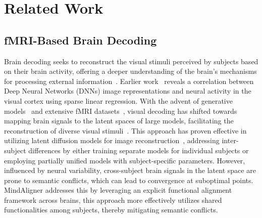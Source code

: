 \section{Related Work}
\subsection{fMRI-Based Brain Decoding}
Brain decoding seeks to reconstruct the visual stimuli perceived by subjects based on their brain activity, offering a deeper understanding of the brain's mechanisms for processing external information~\cite{Naselaris2011}.
Earlier work~\cite{Horikawa2017} reveals a correlation between Deep Neural Networks (DNNs) image representations and neural activity in the visual cortex using sparse linear regression.
With the advent of generative models~\cite{gan, diffusion} and extensive fMRI datasets~\cite{nsd}, visual decoding has shifted towards mapping brain signals to the latent spaces of large models, facilitating the reconstruction of diverse visual stimuli~\cite{gu2022decoding, ozcelik2022reconstruction, Shen2019, gao2023mind, maisurvey, gao2024fmri}.
This approach has proven effective in utilizing latent diffusion models for image reconstruction~\cite{Lin2022, Takagi2023, maiunibrain, mindeyev1, chen2023seeing}, addressing inter-subject differences by either training separate models for individual subjects or employing partially unified models with subject-specific parameters.
However, influenced by neural variability, cross-subject brain signals in the latent space are prone to semantic conflicts, which can lead to convergence at suboptimal points.
MindAligner addresses this by leveraging an explicit functional alignment framework across brains, this approach more effectively utilizes shared functionalities among subjects, thereby mitigating semantic conflicts.

